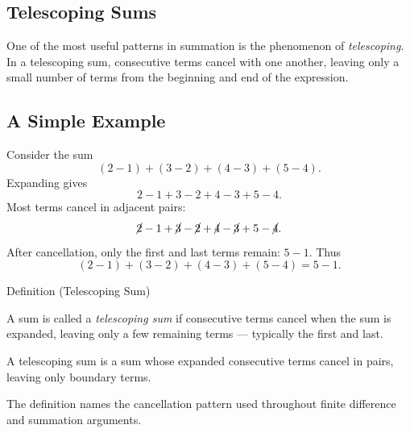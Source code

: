 
\subsection{Telescoping Sums}
\label{sec:telescoping-sums}

\begin{exposition}
One of the most useful patterns in summation is the phenomenon of
\emph{telescoping}. In a telescoping sum, consecutive terms cancel with
one another, leaving only a small number of terms from the beginning
and end of the expression.
\end{exposition}

\subsection*{A Simple Example}

\begin{example*}
Consider the sum
\[
(2-1) + (3-2) + (4-3) + (5-4).
\]
Expanding gives
\[
2 - 1 + 3 - 2 + 4 - 3 + 5 - 4.
\]
Most terms cancel in adjacent pairs:
\[
\cancel{2} - 1 + \cancel{3} - \cancel{2} + \cancel{4} - \cancel{3} + 5 - \cancel{4}.
\]
After cancellation, only the first and last terms remain: \(5 - 1\).
Thus
\[
(2-1) + (3-2) + (4-3) + (5-4) = 5 - 1.
\]
\end{example*}

\begin{definitionbox}{Definition (Telescoping Sum)}
\begin{definition}
\label{def:telescoping-sum}
A sum is called a \emph{telescoping sum} if consecutive terms cancel when
the sum is expanded, leaving only a few remaining terms --- typically
the first and last.
\end{definition}
\end{definitionbox}

\begin{remark*}
A telescoping sum is a sum whose expanded consecutive terms cancel in pairs,
leaving only boundary terms.
\end{remark*}

\begin{remark*}[Interpretation]
The definition names the cancellation pattern used throughout finite
difference and summation arguments.
\end{remark*}

